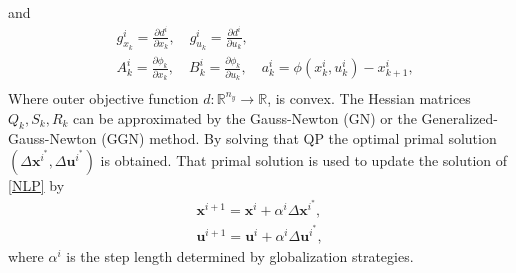and
\begin{equation}\label{QP data}
\begin{aligned}
&g_{x_k}^i = \frac{\partial d^i}{\partial x_k},\quad g_{u_k}^i = \frac{\partial d^i}{\partial u_k},\\
&A_k^i=\frac{\partial \phi_k}{\partial x_k}, \quad B_k^i=\frac{\partial \phi_k}{\partial u_k},\quad a_k^i = \phi(x_k^i,u_k^i)-x_{k+1}^i,\\
\end{aligned}
\end{equation}
Where outer objective function $d:\mathbb{R}^{n_y}\rightarrow \mathbb{R}$, is convex. The Hessian matrices $Q_k,S_k,R_k$ can be approximated by the Gauss-Newton (GN) or the Generalized-Gauss-Newton (GGN) method. By solving that QP the optimal primal solution $(\Delta \mathbf{x}^{i^*}, \Delta \mathbf{u}^{i^*})$ is obtained. That primal solution is used to update the solution of \eqref{NLP} by
\begin{subequations}
	\begin{align}
\mathbf{x}^{i+1} = \mathbf{x}^{i} + \alpha^i \Delta\mathbf{x}^{i^*}, \\ \mathbf{u}^{i+1} = \mathbf{u}^{i} + \alpha^i \Delta\mathbf{u}^{i^*},
\end{align}
\end{subequations}
where $\alpha^i$ is the step length determined by globalization strategies. 